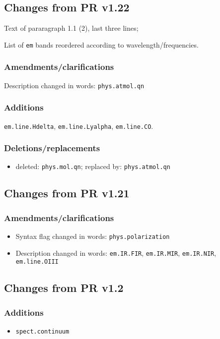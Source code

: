 \documentclass[11pt,a4paper]{ivoa}
\begin{document}
\subsection{Changes from PR v1.22}

Text of pararagraph 1.1 (2), last three lines;

List of {\tt em} bands reordered according to wavelength/frequencies.

\subsubsection*{Amendments/clarifications}
Description changed in words: {\tt phys.atmol.qn}

\subsubsection*{Additions}
{\tt em.line.Hdelta}, {\tt em.line.Lyalpha}, {\tt em.line.CO}.

\subsubsection*{Deletions/replacements}
\begin{itemize}
\item deleted: {\tt phys.mol.qn}; replaced by: {\tt phys.atmol.qn}
\end{itemize}

\subsection{Changes from PR v1.21}
\subsubsection*{Amendments/clarifications}
\begin{itemize}
\item Syntax flag changed in words: {\tt phys.polarization}
\item Description changed in words: {\tt em.IR.FIR}, {\tt em.IR.MIR}, {\tt em.IR.NIR}, {\tt em.line.OIII}
\end{itemize}

\subsection{Changes from PR v1.2}
\subsubsection*{Additions}
\begin{itemize}
\item {\tt spect.continuum}
\end{itemize}
\end{document}
